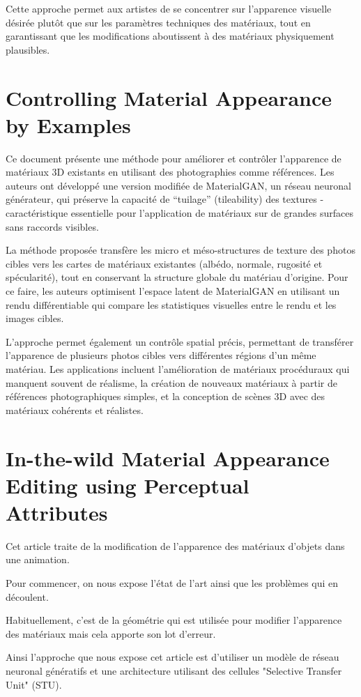 \documentclass{article}
\begin{document}
Cette approche permet aux artistes de se concentrer sur l'apparence visuelle désirée plutôt que sur les paramètres techniques des matériaux, tout en garantissant que les modifications aboutissent à des matériaux physiquement plausibles.

\section{Controlling Material Appearance by Examples}
Ce document présente une méthode pour améliorer et contrôler l'apparence de matériaux 3D existants en utilisant des photographies comme références. Les auteurs ont développé une version modifiée de MaterialGAN, un réseau neuronal générateur, qui préserve la capacité de ``tuilage'' (tileability) des textures - caractéristique essentielle pour l'application de matériaux sur de grandes surfaces sans raccords visibles.

La méthode proposée transfère les micro et méso-structures de texture des photos cibles vers les cartes de matériaux existantes (albédo, normale, rugosité et spécularité), tout en conservant la structure globale du matériau d'origine. Pour ce faire, les auteurs optimisent l'espace latent de MaterialGAN en utilisant un rendu différentiable qui compare les statistiques visuelles entre le rendu et les images cibles.

L'approche permet également un contrôle spatial précis, permettant de transférer l'apparence de plusieurs photos cibles vers différentes régions d'un même matériau. Les applications incluent l'amélioration de matériaux procéduraux qui manquent souvent de réalisme, la création de nouveaux matériaux à partir de références photographiques simples, et la conception de scènes 3D avec des matériaux cohérents et réalistes.

\newpage
\section{In-the-wild Material Appearance Editing using Perceptual Attributes}
Cet article traite de la modification de l’apparence des matériaux d’objets dans une animation.

Pour commencer, on nous expose l’état de l’art ainsi que les problèmes qui en découlent.

Habituellement, c’est de la géométrie qui est utilisée pour modifier l’apparence des matériaux mais cela apporte son lot d’erreur.

Ainsi l’approche que nous expose cet article est d’utiliser un modèle de réseau neuronal génératifs et une architecture utilisant des cellules "Selective Transfer Unit" (STU).
\end{document}
